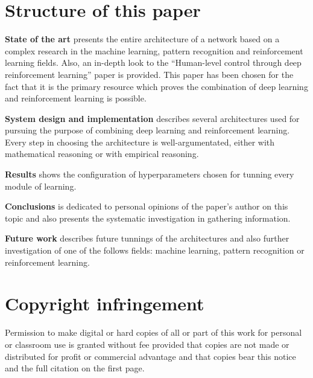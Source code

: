 \section{Structure of this paper}
\label{sec:paper_structure}

 \textbf{State of the art} presents the entire architecture of a network based on a complex research in the machine learning, pattern recognition and reinforcement learning fields. Also, an in-depth look to the ``Human-level control through deep reinforcement learning'' paper is provided. This paper has been chosen for the fact that it is the primary resource which proves the combination of deep learning and reinforcement learning is possible. 

 \textbf{System design and implementation} describes several architectures used for pursuing the purpose of combining deep learning and reinforcement learning. Every step in choosing the architecture is well-argumentated, either with mathematical reasoning or with empirical reasoning.

 \textbf{Results} shows the configuration of hyperparameters chosen for tunning every module of learning.

 \textbf{Conclusions} is dedicated to personal opinions of the paper's author on this topic and also presents the systematic investigation in gathering information.

 \textbf{Future work} describes future tunnings of the architectures and also further investigation of one of the follows fields: machine learning, pattern recognition or reinforcement learning.

\section{Copyright infringement}
\label{sec:copyright}
Permission to make digital or hard copies of all or part of this work for personal or classroom use is granted without fee provided that copies are not made or distributed for profit or commercial advantage and that copies bear this notice and the full citation on the first page. 







